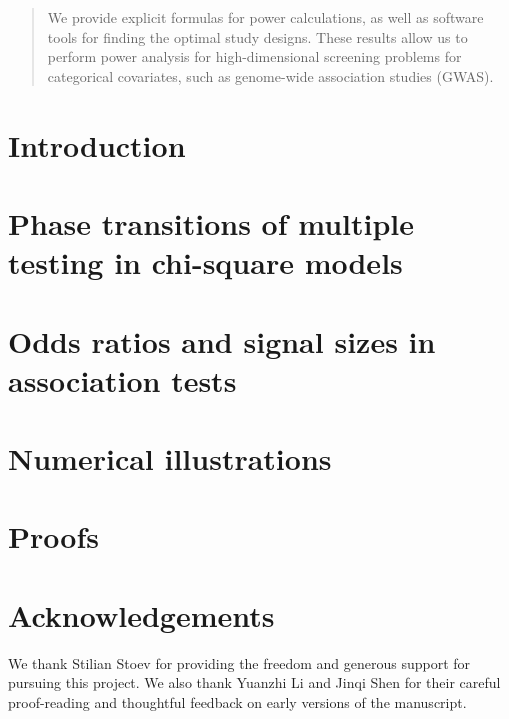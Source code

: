 \documentclass[ejs]{imsart}
\numberwithin{equation}{section}
\theoremstyle{plain}
\theoremstyle{definition}
\theoremstyle{remark}
\begin{document}
\begin{frontmatter}
\begin{abstract}
We provide explicit formulas for power calculations, as well as software tools for finding the optimal study designs.
These results allow us to perform power analysis for high-dimensional screening problems for categorical covariates, such as genome-wide association studies (GWAS).
\end{abstract}

\begin{keyword}[class=MSC]
\end{keyword}

\begin{keyword}
\end{keyword}
\tableofcontents
\end{frontmatter}

\section{Introduction}
\label{sec:intro}


\section{Phase transitions of multiple testing in chi-square models}
\label{sec:chisq-boundaries}


\section{Odds ratios and signal sizes in association tests}
\label{sec:signal-size-odds-ratio}


\section{Numerical illustrations}
\label{sec:numerical}


\appendix
\section{Proofs}
\label{sec:proofs}



\section*{Acknowledgements}
We thank Stilian Stoev for providing the freedom and generous support for pursuing this project.
We also thank Yuanzhi Li and Jinqi Shen for their careful proof-reading and thoughtful feedback on early versions of the manuscript.
\end{document}
